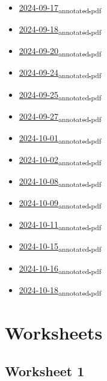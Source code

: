 \documentclass{amsart}
\begin{document}
\begin{itemize}
\item \href{Lecture slides/2024-09-17\_annotated.pdf}{2024-09-17\textsubscript{annotated.pdf}}
\item \href{Lecture slides/2024-09-18\_annotated.pdf}{2024-09-18\textsubscript{annotated.pdf}}
\item \href{Lecture slides/2024-09-20\_annotated.pdf}{2024-09-20\textsubscript{annotated.pdf}}
\item \href{Lecture slides/2024-09-24\_annotated.pdf}{2024-09-24\textsubscript{annotated.pdf}}
\item \href{Lecture slides/2024-09-25\_annotated.pdf}{2024-09-25\textsubscript{annotated.pdf}}
\item \href{Lecture slides/2024-09-27\_annotated.pdf}{2024-09-27\textsubscript{annotated.pdf}}
\item \href{Lecture slides/2024-10-01\_annotated.pdf}{2024-10-01\textsubscript{annotated.pdf}}
\item \href{Lecture slides/2024-10-02\_annotated.pdf}{2024-10-02\textsubscript{annotated.pdf}}
\item \href{Lecture slides/2024-10-08\_annotated.pdf}{2024-10-08\textsubscript{annotated.pdf}}
\item \href{Lecture slides/2024-10-09\_annotated.pdf}{2024-10-09\textsubscript{annotated.pdf}}
\item \href{Lecture slides/2024-10-11\_annotated.pdf}{2024-10-11\textsubscript{annotated.pdf}}
\item \href{Lecture slides/2024-10-15\_annotated.pdf}{2024-10-15\textsubscript{annotated.pdf}}
\item \href{Lecture slides/2024-10-16\_annotated.pdf}{2024-10-16\textsubscript{annotated.pdf}}
\item \href{Lecture slides/2024-10-18\_annotated.pdf}{2024-10-18\textsubscript{annotated.pdf}}
\end{itemize}
\section{Worksheets}
\label{sec:orgc119ee1}
\subsection{Worksheet 1}
\label{sec:orgf83fc48}
\togglefalse{solutions}
\end{document}
